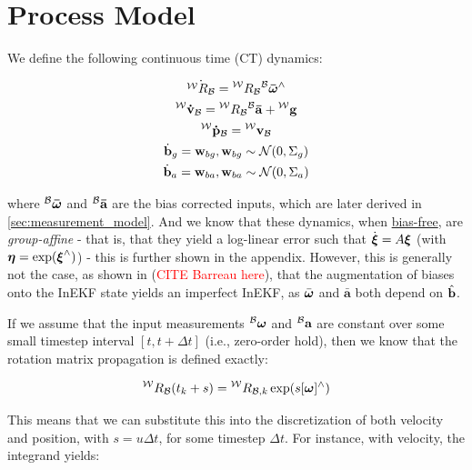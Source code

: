 \section{Process Model}

We define the following continuous time (CT) dynamics:

\begin{equation}
  \begin{gathered}
    \dot{{}^\mathcal{W}R_\mathcal{B}} = {}^\mathcal{W}R_\mathcal{B}{}^\mathcal{B}\mathbf{\bar{\boldsymbol{\omega}}}^\wedge \\
    {}^\mathcal{W}\mathbf{\dot{\mathbf{v}}}_{\mathcal{B}} = {}^\mathcal{W}R_\mathcal{B} {}^\mathcal{B}\mathbf{\bar{a}} + {}^\mathcal{W}\mathbf{g} \\
  {}^\mathcal{W}\mathbf{\dot{\mathbf{p}}}_{\mathcal{B}} = {}^\mathcal{W}\mathbf{v}_{\mathcal{B}} \\
  \dot{\mathbf{b}}_g = \mathbf{w}_{bg}, \mathbf{w}_{bg} \sim \mathcal{N}(0,\Sigma_g) \\
  \dot{\mathbf{b}}_a = \mathbf{w}_{ba}, \mathbf{w}_{ba} \sim \mathcal{N}(0,\Sigma_a)
  \end{gathered}
  \label{eq:ct_dynamics}
\end{equation}

where ${}^\mathcal{B}\mathbf{\bar{\boldsymbol{\omega}}}$ and ${}^\mathcal{B}\mathbf{\bar{a}}$ are the bias corrected inputs, which are later derived in \ref{sec:measurement_model}. And we know that these dynamics, when \underline{bias-free}, are \textit{group-affine} - that is, that they yield a log-linear error such that $\dot{\boldsymbol{\xi}} = A\boldsymbol{\xi}$ (with $\boldsymbol{\eta} = \exp(\boldsymbol{\xi}^\wedge)$) - this is further shown in the appendix. However, this is generally not the case, as shown in (\textcolor{red}{CITE Barreau here}), that the augmentation of biases onto the InEKF state yields an imperfect InEKF, as $\bar{\boldsymbol{\omega}}$ and $\bar{\mathbf{a}}$ both depend on $\hat{\mathbf{b}}$.

If we assume that the input measurements ${}^\mathcal{B}\mathbf{\boldsymbol{\omega}}$ and ${}^\mathcal{B}\mathbf{a}$ are constant over some small timestep interval $[t, t + \Delta t]$ (i.e., zero-order hold), then we know that the rotation matrix propagation is defined exactly:

\begin{equation}
  {}^\mathcal{W}R_\mathcal{B}(t_k+s) = {}^\mathcal{W}R_\mathcal{B,\mathnormal{k}} \exp(s[\boldsymbol{\omega}]^\wedge) 
  \label{eq:rot_prop}
\end{equation}

This means that we can substitute this into the discretization of both velocity and position, with $s = u \Delta t$, for some timestep $\Delta t$. For instance, with velocity, the integrand yields:

